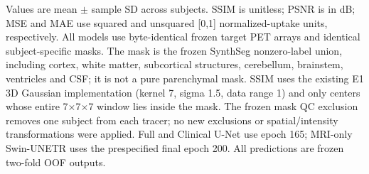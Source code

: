 \begin{table}[t]
\centering
\caption{Mask-restricted quality of frozen two-fold OOF PET predictions.}
\label{tab:r3_11_masked_summary}
\par\smallskip
\begin{minipage}{\textwidth}\footnotesize
Values are mean $\pm$ sample SD across subjects. SSIM is unitless; PSNR is in dB; MSE and MAE use squared and unsquared [0,1] normalized-uptake units, respectively. All models use byte-identical frozen target PET arrays and identical subject-specific masks. The mask is the frozen SynthSeg nonzero-label union, including cortex, white matter, subcortical structures, cerebellum, brainstem, ventricles and CSF; it is not a pure parenchymal mask. SSIM uses the existing E1 3D Gaussian implementation (kernel 7, sigma 1.5, data range 1) and only centers whose entire 7$\times$7$\times$7 window lies inside the mask. The frozen mask QC exclusion removes one subject from each tracer; no new exclusions or spatial/intensity transformations were applied. Full and Clinical U-Net use epoch 165; MRI-only Swin-UNETR uses the prespecified final epoch 200. All predictions are frozen two-fold OOF outputs.
\end{minipage}
\end{table}
